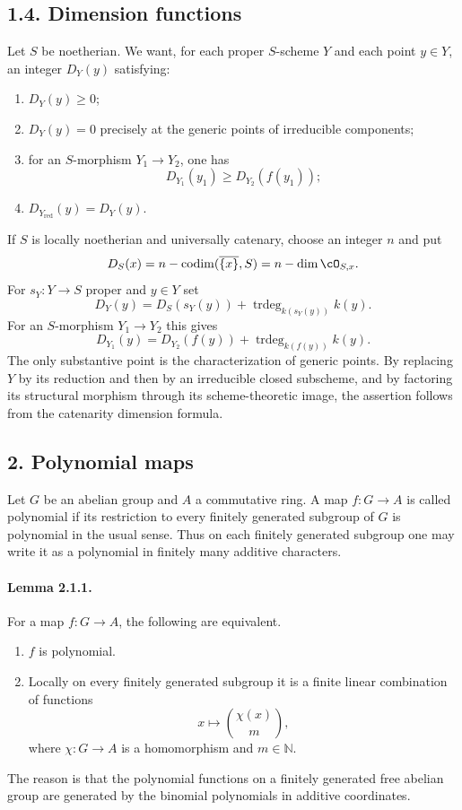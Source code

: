 \documentclass[11pt]{article}
\theoremstyle{plain}
\theoremstyle{definition}
\theoremstyle{remark}
\newcommand{\NN}{\mathbb N}
\DeclareMathOperator{\codim}{codim}
\providecommand{\codim}{\operatorname{codim}}
\providecommand{\trdeg}{\operatorname{trdeg}}
\begin{document}
\subsection*{1.4. Dimension functions}

Let $S$ be noetherian. We want, for each proper $S$-scheme $Y$ and each point $y\in Y$, an integer $D_Y(y)$ satisfying:
\begin{enumerate}[label=\roman*)]
\item $D_Y(y)\geq0$;
\item $D_Y(y)=0$ precisely at the generic points of irreducible components;
\item for an $S$-morphism $Y_1\to Y_2$, one has
\[
D_{Y_1}(y_1)\geq D_{Y_2}(f(y_1));
\]
\item $D_{Y_{\mathrm{red}}}(y)=D_Y(y)$.
\end{enumerate}

If $S$ is locally noetherian and universally catenary, choose an integer $n$ and put
\[
D_S(x)=n-\codim(\overline{\{x\}},S)=n-\dim \cO_{S,x}.
\]
For $s_Y:Y\to S$ proper and $y\in Y$ set
\[
D_Y(y)=D_S(s_Y(y))+\trdeg_{k(s_Y(y))}k(y).
\]
For an $S$-morphism $Y_1\to Y_2$ this gives
\[
D_{Y_1}(y)=D_{Y_2}(f(y))+\trdeg_{k(f(y))}k(y).
\]
The only substantive point is the characterization of generic points. By replacing $Y$ by its reduction and then by an irreducible closed subscheme, and by factoring its structural morphism through its scheme-theoretic image, the assertion follows from the catenarity dimension formula.

\subsection*{2. Polynomial maps}

Let $G$ be an abelian group and $A$ a commutative ring. A map $f:G\to A$ is called polynomial if its restriction to every finitely generated subgroup of $G$ is polynomial in the usual sense. Thus on each finitely generated subgroup one may write it as a polynomial in finitely many additive characters.

\paragraph{Lemma 2.1.1.}
For a map $f:G\to A$, the following are equivalent.
\begin{enumerate}[label=\roman*)]
\item $f$ is polynomial.
\item Locally on every finitely generated subgroup it is a finite linear combination of functions
\[
x\longmapsto {\chi(x)\choose m},
\]
where $\chi:G\to A$ is a homomorphism and $m\in\NN$.
\end{enumerate}
The reason is that the polynomial functions on a finitely generated free abelian group are generated by the binomial polynomials in additive coordinates.
\end{document}
